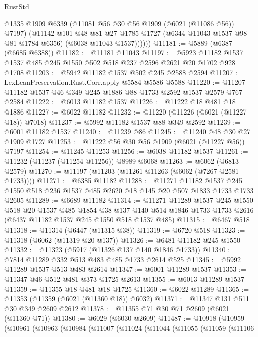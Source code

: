 \begin{lexlean}{RustStd}
\begin{coremodule}
            @1335
            @1909
            @6339
            (@11081 @56 @30 @56 @1909 (@6021 (@11086 @56)) @7197)
            (@11142
              @101
              @48
              @81
              @27
              @1785
              @1727
              (@6344 @11043 @1537 @98 @81 @1784 @6356)
              (@6038 @11043 @1537))))))
@11181 := @5889 (@6387 (@6685 @6388))
@11182 := @11181 @11043
@11197 := @5923 @11182 @1537 @1537 @485 @245 @1550 @502 @518 @237 @2596 @2621 @20 @1702 @928 @1708
@11203 := @5942 @11182 @1537 @502 @245 @2588 @2594
@11207 := LexLeanPreservation.Rust.Corr.apply @5584 @5586 @5588
@11220 := @11207 @11182 @1537 @46 @349 @245 @1886 @88 @1733 @2592 @1537 @2579 @767 @2584
@11222 := @6013 @11182 @1537
@11226 := @11222 @18 @481 @18 @1886
@11227 := @6022 @11182
@11232 := @11220 (@11226 (@6021 (@11227 @18)) @7018)
@11237 := @5992 @11182 @1537 @88 @349 @2592
@11239 := @6001 @11182 @1537
@11240 := @11239 @86
@11245 := @11240 @48 @30 @27 @1909 @1727
@11253 := @11222 @56 @30 @56 @1909 (@6021 (@11227 @56)) @7197
@11254 := @11245 @11253
@11256 := @6038 @11182 @1537
@11261 := @11232 (@11237 (@11254 @11256)) @8989 @6068
@11263 := @6062 (@6813 @2579)
@11270 := @11197 (@11203 (@11261 @11263 (@6062 (@7267 @2581 @1733))))
@11271 := @6385 @11182
@11288 := @11271
    @11182
    @1537
    @245
    @1550
    @518
    @236
    @1537
    @485
    @2620
    @18
    @145
    @20
    @507
    @1833
    @1733
    @1733
    @2605
@11289 := @6689 @11182
@11314 := @11271
    @11289
    @1537
    @245
    @1550
    @518
    @20
    @1537
    @485
    @1854
    @38
    @137
    @140
    @514
    @1846
    @1733
    @1733
    @2616
    (@6437 @11182 @1537 @245 @1550 @518 @1537 @485)
@11315 := @6467 @518
@11318 := @11314 (@6447 (@11315 @38))
@11319 := @6720 @518
@11323 := @11318 (@6062 (@11319 @20 @137))
@11326 := @6481 @11182 @245 @1550
@11332 := @11323 (@5917 (@11326 @137 @140 @1846 @1733))
@11340 := @7814 @11289 @332 @513 @483 @485 @1733 @2614 @525
@11345 := @5992 @11289 @1537 @513 @483 @2614
@11347 := @6001 @11289 @1537
@11353 := @11347 @46 @512 @481 @373 @1725 @2613
@11355 := @6013 @11289 @1537
@11359 := @11355 @18 @481 @18 @1725
@11360 := @6022 @11289
@11365 := @11353 (@11359 (@6021 (@11360 @18)) @6032)
@11371 := @11347 @131 @511 @30 @349 @2609 @2612
@11378 := @11355 @71 @30 @71 @2609 (@6021 (@11360 @71))
@11380 := @6029 (@6030 @2609)
@11487 := @10918
    (@10959
      (@10961
        (@10963
          (@10984
            (@11007
              (@11024
                (@11044
                  (@11055
                    (@11059
                      (@11106

\end{coremodule}
\end{lexlean}
